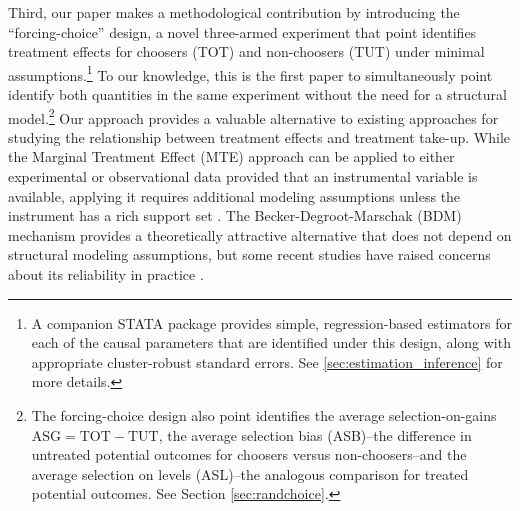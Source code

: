 \documentclass[12pt, a4paper]{article}
\begin{document}
Third, our paper makes a methodological contribution by introducing the ``forcing-choice'' design, a novel three-armed experiment that point identifies treatment effects for choosers (TOT) and non-choosers (TUT) under minimal assumptions.\footnote{A companion STATA package provides simple, regression-based estimators for each of the causal parameters that are identified under this design, along with appropriate cluster-robust standard errors. See \autoref{sec:estimation_inference} for more details.}  
To our knowledge, this is the first paper to simultaneously point identify both quantities in the same experiment without the need for a structural model.\footnote{The forcing-choice design also point identifies the average selection-on-gains $\text{ASG} = \text{TOT} - \text{TUT}$, the average selection bias (ASB)--the difference in untreated potential outcomes for choosers versus non-choosers--and the average selection on levels (ASL)--the analogous comparison for treated potential outcomes. See Section \ref{sec:randchoice}.}
Our approach provides a valuable alternative to existing approaches for studying the relationship between treatment effects and treatment take-up. While the Marginal Treatment Effect (MTE) approach can be applied to either experimental or observational data provided that an instrumental variable is available, applying it requires additional modeling assumptions unless the instrument has a rich support set \citep{mogstad2018using}. The Becker-Degroot-Marschak (BDM) mechanism provides a theoretically attractive alternative that does not depend on structural modeling assumptions, but some recent studies have raised concerns about its reliability in practice \citep{bohm1997eliciting,banerji2014detection,mamadehussene2023reliability}.
\end{document}
